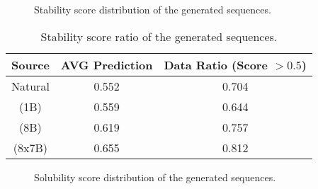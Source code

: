 \begin{figure}[!htbp]
\centering
{}%
%
\caption{Stability score distribution of the generated sequences.}
\label{fig:protein:conditioned_generation_stability}
\end{figure}

\begin{table}[!h]
\centering
\begin{tabular}{ccc}
\toprule
Source & AVG Prediction & Data Ratio (Score $>0.5$) \\
\midrule
Natural & 0.552 & 0.704 \\
\ourM{} (1B) & 0.559 & 0.644 \\
\ourM{} (8B) & 0.619 & 0.757 \\
\ourM{} (8x7B) & 0.655 & 0.812 \\
\bottomrule
\end{tabular}
\caption{Stability score ratio of the generated sequences.}
\label{tab:protein:conditioned_generation_stability}
\end{table}

\begin{figure}[!htbp]
\centering
{}%
%
\caption{Solubility score distribution of the generated sequences.}
\label{fig:protein:conditioned_generation_solubility}
\end{figure}

